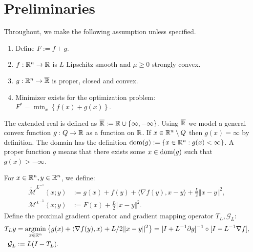 \documentclass[12pt]{article}
\begin{document}
\section{Preliminaries}\label{sec:preliminaries}
    Throughout, we make the following assumption unless specified. 
    \begin{assumption}\label{ass:smooth-nsmooth-additive}
        \;
        \begin{enumerate}
            \item Define $F := f + g$. 
            \item $f: \mathbb R^n \rightarrow \mathbb R$ is $L$ Lipschitz smooth and $\mu \ge 0$ strongly convex. 
            \item $g: \mathbb R^n \rightarrow \overline {\mathbb R}$ is proper, closed and convex. 
            \item Minimizer exists for the optimization problem: $F^* = \min_x \left\lbrace f(x) + g(x)\right\rbrace$. 
        \end{enumerate}
    \end{assumption}
    The extended real is defined as $\overline {\mathbb R} := \mathbb R \cup \{\infty, - \infty\}$. 
    Using $\overline {\mathbb R}$ we model a general convex function $g: Q \rightarrow \mathbb R$ as a function on $\mathbb R$. 
    If $x \in \mathbb R^n \setminus Q$ then $g(x) = \infty$ by definition. 
    The domain has the definition $\operatorname{dom}(g) := \{x \in \mathbb R^n : g(x) < \infty\}$. 
    A proper function $g$ means that there exists some $x \in \operatorname{dom}(g)$ such that $g(x) > -\infty$. 
    \par
    For $x \in \mathbb R^n, y \in \mathbb R^n$, we define: 
    \begin{align}
        \widetilde{\mathcal M}^{L^{-1}}
        (x; y) 
        &:=
        g(x) + f(y) + \langle \nabla f(y), x - y\rangle 
        + \frac{L}{2}\Vert x - y\Vert^2,  \label{eqn:pg_model-func}
        \\
        \mathcal M^{L^{-1}}(x; y) &:= F(x) + \frac{L}{2}\Vert x - y\Vert^2. 
        \label{eqn:pp_model-func}
    \end{align}
    Define the proximal gradient operator and gradient mapping operator $T_L, \mathcal G_L$: 
    \begin{align*}
        T_Ly &= \mathop{\rm argmin}\limits_{x \in \mathbb R^n} \left\lbrace
            g(x) + \langle \nabla f(y), x\rangle + L/2\Vert x - y\Vert^2
        \right\rbrace = [I + L^{-1}\partial g]^{-1}\circ [I - L^{-1}\nabla f], 
        \\
        \mathcal G_L 
        &:= L(I - T_L). 
    \end{align*}
\end{document}
